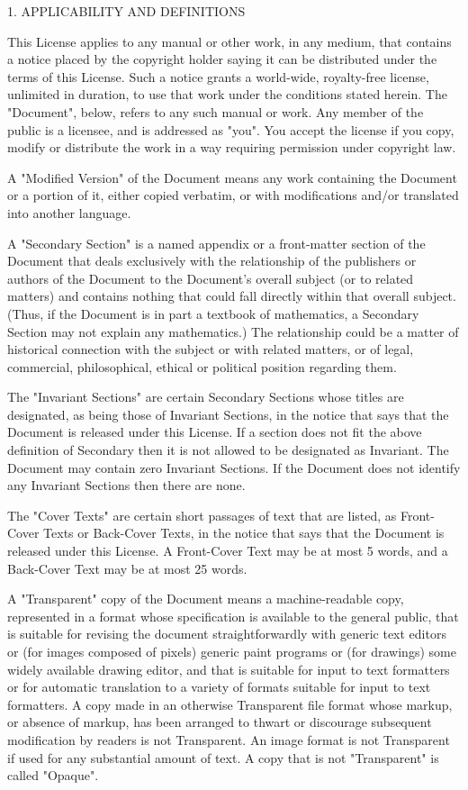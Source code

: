 \documentclass[oneside,english,a4paper,10pt,oneside,openany,final]{memoir}
\begin{document}
1. APPLICABILITY AND DEFINITIONS

This License applies to any manual or other work, in any medium, that contains a notice placed by the copyright holder saying it can be distributed under the terms of this License. Such a notice grants a world-wide, royalty-free license, unlimited in duration, to use that work under the conditions stated herein. The "Document", below, refers to any such manual or work. Any member of the public is a licensee, and is addressed as "you". You accept the license if you copy, modify or distribute the work in a way requiring permission under copyright law.

A "Modified Version" of the Document means any work containing the Document or a portion of it, either copied verbatim, or with modifications and/or translated into another language.

A "Secondary Section" is a named appendix or a front-matter section of the Document that deals exclusively with the relationship of the publishers or authors of the Document to the Document's overall subject (or to related matters) and contains nothing that could fall directly within that overall subject. (Thus, if the Document is in part a textbook of mathematics, a Secondary Section may not explain any mathematics.) The relationship could be a matter of historical connection with the subject or with related matters, or of legal, commercial, philosophical, ethical or political position regarding them.

The "Invariant Sections" are certain Secondary Sections whose titles are designated, as being those of Invariant Sections, in the notice that says that the Document is released under this License. If a section does not fit the above definition of Secondary then it is not allowed to be designated as Invariant. The Document may contain zero Invariant Sections. If the Document does not identify any Invariant Sections then there are none.

The "Cover Texts" are certain short passages of text that are listed, as Front-Cover Texts or Back-Cover Texts, in the notice that says that the Document is released under this License. A Front-Cover Text may be at most 5 words, and a Back-Cover Text may be at most 25 words.

A "Transparent" copy of the Document means a machine-readable copy, represented in a format whose specification is available to the general public, that is suitable for revising the document straightforwardly with generic text editors or (for images composed of pixels) generic paint programs or (for drawings) some widely available drawing editor, and that is suitable for input to text formatters or for automatic translation to a variety of formats suitable for input to text formatters. A copy made in an otherwise Transparent file format whose markup, or absence of markup, has been arranged to thwart or discourage subsequent modification by readers is not Transparent. An image format is not Transparent if used for any substantial amount of text. A copy that is not "Transparent" is called "Opaque".
\end{document}
